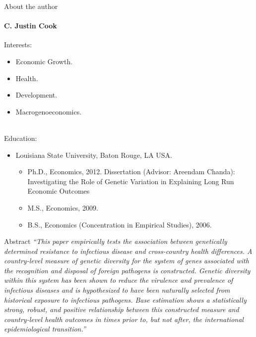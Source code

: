 \documentclass[pdftex,12pt,xcolor=pdftex,table]{beamer}
\theoremstyle{definition}
\theoremstyle{remark}
\numberwithin{equation}{section}
\numberwithin{figure}{section}
\begin{document}
\begin{frame}{About the author}
\framesubtitle{C. Justin Cook}
\justifying
Interests:
\begin{itemize}
    \item Economic Growth.
    \item Health.
    \item Development.
    \item Macrogenoeconomics.
\end{itemize}\\

Education:
\begin{itemize}
    \item Louisiana State University, Baton Rouge, LA USA.
    \begin{itemize}
        \item Ph.D., Economics, 2012. Dissertation (Advisor: Areendam Chanda): Investigating the Role of Genetic Variation in
Explaining Long Run Economic Outcomes
       \item M.S., Economics, 2009.
       \item B.S., Economics (Concentration in Empirical Studies), 2006.


    \end{itemize}
\end{itemize}
\end{frame}

\begin{frame}{Abstract}
\justifying
 \textit{“This paper empirically tests the association between genetically determined resistance to infectious disease and cross-country health differences. A country-level measure of genetic diversity for the system of genes associated with the recognition and disposal of foreign pathogens is constructed. Genetic diversity within this system has been shown to reduce the virulence and prevalence of infectious diseases and is hypothesized to have been naturally selected from historical exposure to infectious pathogens. Base estimation shows a statistically strong, robust, and positive relationship between this constructed measure and country-level health outcomes in times prior to, but not after, the international epidemiological transition.”}
 
\end{frame}
\end{document}
